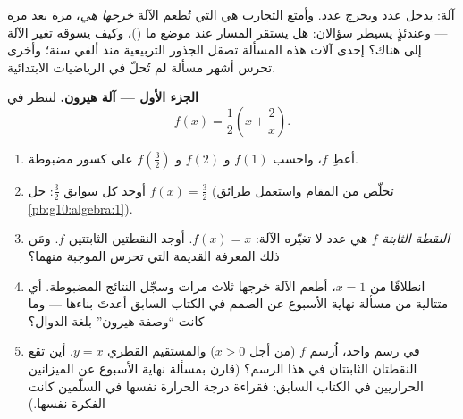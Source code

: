 \begin{problem}
\label{pb:g10:functions:1}
 آلة: يدخل عدد ويخرج عدد.
وأمتع التجارب هي التي تُطعم الآلة \emph{خرجها
هي}، مرة بعد مرة --- وعندئذٍ يسيطر سؤالان:
هل يستقر المسار عند موضع ما (\emph{})،
وكيف يسوقه تغير الآلة إلى هناك؟ إحدى آلات هذه
المسألة تصقل الجذور التربيعية منذ ألفي
سنة؛ وأخرى تحرس أشهر مسألة لم تُحلّ
في الرياضيات الابتدائية.

\medskip
\noindent\textbf{الجزء الأول --- آلة هيرون.}
لننظر في 
\[
f(x) = \frac12\left(x + \frac2x\right).
\]
\begin{enumerate}
  \item أعطِ  $f$، واحسب $f(1)$ و $f(2)$ و
        $f\!\left(\frac32\right)$ على  كسور مضبوطة.
  \item أوجد كل سوابق $\frac32$: حل
        $f(x) = \frac32$ (تخلّص من المقام واستعمل
        طرائق \cref{pb:g10:algebra:1}).
  \item \emph{النقطة الثابتة}  $f$ هي
        عدد لا تغيّره الآلة: $f(x) = x$. أوجد النقطتين
        الثابتتين  $f$. ومَن ذلك المعرفة القديمة التي تحرس
        الموجبة منهما؟
  \item انطلاقًا من $x = 1$، أطعم الآلة خرجها
        ثلاث مرات وسجّل النتائج المضبوطة. أي متتالية
        من مسألة نهاية الأسبوع عن الصمم في الكتاب السابق أعدتَ بناءها --- وما كانت
        ``وصفة هيرون'' بلغة الدوال؟
  \item في رسم واحد، اُرسم  $f$ (من أجل $x > 0$)
        والمستقيم القطري $y = x$. أين تقع النقطتان
        الثابتتان في هذا الرسم؟ (قارن
        بمسألة نهاية الأسبوع عن الميزانين الحراريين في الكتاب السابق: فقراءة درجة الحرارة نفسها
        في السلّمين كانت الفكرة نفسها.)
\end{enumerate}


\end{problem}
